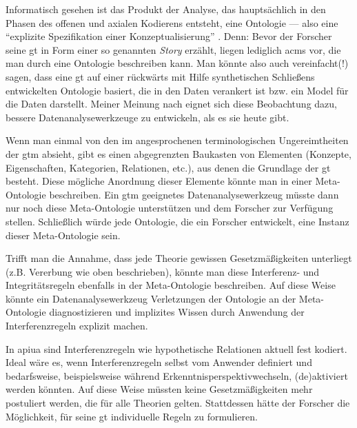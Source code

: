 Informatisch gesehen ist das Produkt der Analyse, das hauptsächlich in den Phasen des offenen und axialen Kodierens entsteht, eine Ontologie --- also eine ``explizite Spezifikation einer Konzeptualisierung'' \citep{Gruber:1993jz}. Denn: Bevor der Forscher seine \acrlong{gt} in Form einer so genannten \textit{Story} erzählt, liegen lediglich \glspl{acm} vor, die man durch eine Ontologie beschreiben kann. Man könnte also auch vereinfacht(!) sagen, dass eine \acrlong{gt} auf einer rückwärts mit Hilfe synthetischen Schließens entwickelten Ontologie basiert, die in den Daten verankert ist bzw. ein Model für die Daten darstellt. Meiner Meinung nach eignet sich diese Beobachtung dazu, bessere Datenanalysewerkzeuge zu entwickeln, als es sie heute gibt.

Wenn man einmal von den im  angesprochenen terminologischen Ungereimtheiten der \gls{gtm} absieht, gibt es einen abgegrenzten Baukasten von Elementen (Konzepte, Eigenschaften, Kategorien, Relationen, etc.), aus denen die Grundlage der \gls{gt} besteht. Diese mögliche Anordnung dieser Elemente könnte man in einer Meta-Ontologie beschreiben. Ein \gls{gtm} geeignetes Datenanalysewerkzeug müsste dann nur noch diese Meta-Ontologie unterstützen und dem Forscher zur Verfügung stellen. Schließlich würde jede Ontologie, die ein Forscher entwickelt, eine Instanz dieser Meta-Ontologie sein.

Trifft man die Annahme, dass jede Theorie gewissen Gesetzmäßigkeiten unterliegt (z.B. Vererbung wie oben beschrieben), könnte man diese Interferenz- und Integritätsregeln ebenfalls in der Meta-Ontologie beschreiben. Auf diese Weise könnte ein Datenanalysewerkzeug Verletzungen der Ontologie an der Meta-Ontologie diagnostizieren und implizites Wissen durch Anwendung der Interferenzregeln explizit machen.

In \gls{apiua} sind Interferenzregeln wie hypothetische Relationen aktuell fest kodiert. Ideal wäre es, wenn Interferenzregeln selbst vom Anwender definiert und bedarfsweise, beispielsweise während Erkenntnisperspektivwechseln, (de)aktiviert werden könnten. Auf diese Weise müssten keine Gesetzmäßigkeiten mehr postuliert werden, die für alle Theorien gelten. Stattdessen hätte der Forscher die Möglichkeit, für seine \gls{gt} individuelle Regeln zu formulieren.

